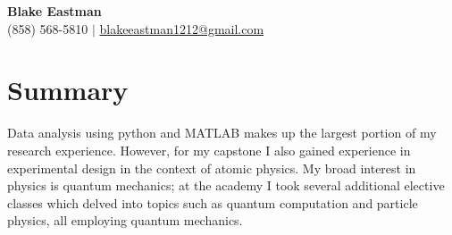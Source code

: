 \documentclass[letterpaper,10pt]{article}
\begin{document}
\begin{center}
  \textbf{\Huge Blake Eastman} \\
  \small (858) 568-5810 $|$ \href{mailto:blakeeastman1212@gmail.com}{blakeeastman1212@gmail.com} 
\end{center}

\section*{Summary}
Data analysis using python and MATLAB makes up the largest portion of my research experience. However, for my capstone I also gained experience in experimental design in the context of atomic physics. My broad interest in physics is quantum mechanics; at the academy I took several additional elective classes which delved into topics such as quantum computation and particle physics, all employing quantum mechanics.
\end{document}

